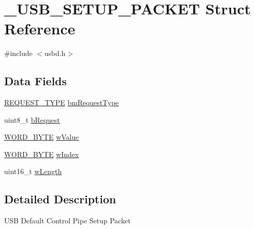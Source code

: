 \hypertarget{struct__USB__SETUP__PACKET}{\section{\-\_\-\-U\-S\-B\-\_\-\-S\-E\-T\-U\-P\-\_\-\-P\-A\-C\-K\-E\-T Struct Reference}
\label{struct__USB__SETUP__PACKET}
}


{\ttfamily \#include $<$usbd.\-h$>$}

\subsection*{Data Fields}
\begin{DoxyCompactItemize}
\item 
\hyperlink{group__USBD__Core_gac85164494feb72445fab7999a3723b6f}{R\-E\-Q\-U\-E\-S\-T\-\_\-\-T\-Y\-P\-E} \hyperlink{struct__USB__SETUP__PACKET_ac3379b5aabd08a8d980fe8d030f5d6a8}{bm\-Request\-Type}
\item 
uint8\-\_\-t \hyperlink{struct__USB__SETUP__PACKET_a95f462f8491a38e7ee662dcd95d5cb6a}{b\-Request}
\item 
\hyperlink{group__USBD__Core_ga340ec8de2973608b96d5cc7379b9561a}{W\-O\-R\-D\-\_\-\-B\-Y\-T\-E} \hyperlink{struct__USB__SETUP__PACKET_a790f014cc1dac6148a182b1cbe24bffe}{w\-Value}
\item 
\hyperlink{group__USBD__Core_ga340ec8de2973608b96d5cc7379b9561a}{W\-O\-R\-D\-\_\-\-B\-Y\-T\-E} \hyperlink{struct__USB__SETUP__PACKET_a1f0ec0c931efe4a96d92b3ceea80b2a3}{w\-Index}
\item 
uint16\-\_\-t \hyperlink{struct__USB__SETUP__PACKET_a2beb83e5854b4a7bc518e5cfbc3f38a6}{w\-Length}
\end{DoxyCompactItemize}


\subsection{Detailed Description}
U\-S\-B Default Control Pipe Setup Packet 

